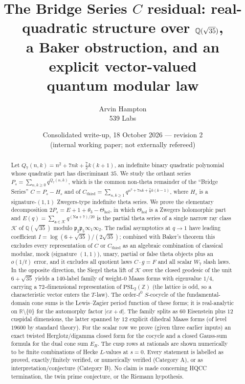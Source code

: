 \documentclass[11pt]{article}
\title{The Bridge Series $C$ residual: real-quadratic structure over $\Q(\sqrt{35})$,\\
a Baker obstruction, and an explicit vector-valued\\ quantum modular law}
\author{Arvin Hampton\\ \small 539 Labs}
\date{Consolidated write-up, 18 October 2026 --- revision 2\\ \small (internal working paper; not externally refereed)}
\theoremstyle{definition}
\newcommand{\Q}{\mathbb{Q}}
\newcommand{\Z}{\mathbb{Z}}
\newcommand{\R}{\mathbb{R}}
\newcommand{\K}{\mathcal{K}}
\newcommand{\fp}{\mathfrak{p}}
\newcommand{\fa}{\mathfrak{a}}
\newcommand{\Thol}{\Theta_{\mathrm{hol}}}
\newcommand{\Cthird}{C_{\mathrm{third}}}
\newcommand{\Nm}{\mathrm{N}}
\begin{document}
\maketitle

\begin{abstract}
Let $Q_7(n,k)=n^2+7nk+\tfrac72 k(k+1)$, an indefinite binary quadratic polynomial whose
quadratic part has discriminant $35$. We study the orthant series
$P_s=\sum_{n,k\ge 0}q^{Q_7(n,k)}$, which is the common non-theta remainder of the
``Bridge Series'' $C=P_s-H_s$ and of $\Cthird=\sum_{n,k\ge1}q^{n^2+7nk+\frac72k(k-1)}$,
where $H_s$ is a signature-$(1,1)$ Zwegers-type indefinite theta series.
We prove the elementary decomposition $2P_s=E+1+\theta_3-\Thol$, in which
$\Thol$ is a Zwegers holomorphic part and $E(q)=\sum_{\fa\in\K}q^{(\Nm\fa+7)/20}$ is the
partial theta series of a single narrow ray class $\K$ of $\Q(\sqrt{35})$ modulo $\fp_2\fp_5\infty_1\infty_2$.
The radial asymptotics at $q\to1$ have leading coefficient
$I=\log(6+\sqrt{35})/(2\sqrt{35})$; combined with Baker's theorem this excludes every
representation of $C$ or $\Cthird$ as an algebraic combination of classical modular, mock
(signature $(1,1)$), unary, partial or false theta objects plus an $o(1/t)$ error, and it excludes
all quotient laws $C\cdot g=F$ and all scalar $W_7$ slash laws. In the opposite direction,
the Siegel theta lift of $\K$ over the closed geodesic of the unit $6+\sqrt{35}$ yields a
$140$-label family of weight-$0$ Maass forms with eigenvalue $1/4$, carrying a $72$-dimensional
representation of $\mathrm{PSL}_2(\Z)$ (the lattice is odd, so a characteristic vector enters the $T$-law).
The order-$t^0$ $S$-cocycle of the fundamental-domain cone sums is the Lewis--Zagier period
function of these forms; it is real-analytic on $\R\setminus\{0\}$ for the automorphy factor
$|cx+d|$. The family splits as $60$ Eisenstein plus $12$ cuspidal dimensions, the latter spanned by
$12$ explicit dihedral Maass forms (of level $19600$ by standard theory). For the scalar row we prove (given three
earlier inputs) an exact twisted Herglotz/digamma closed form for the cocycle and a closed
Gauss-sum formula for the dual cone sum $E_R$. The cusp rows at rationals are shown numerically to
be finite combinations of Hecke $L$-values at $s=0$. Every statement is labelled as proved,
exactly/finitely verified, or numerically verified (Category A), or as interpretation/conjecture
(Category B). No claim is made concerning HQCC termination, the twin prime conjecture, or the Riemann
hypothesis.
\end{abstract}
\end{document}
